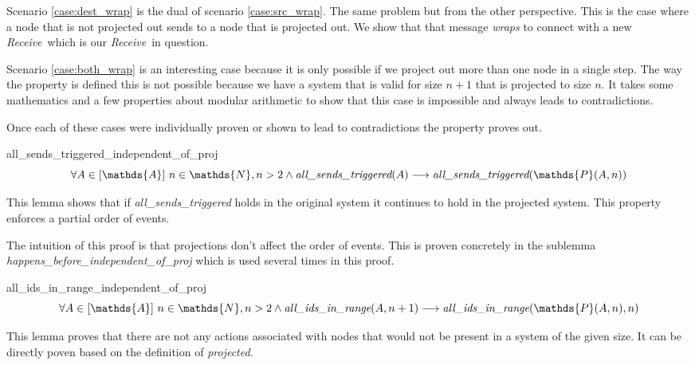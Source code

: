\documentclass[runningheads]{llncs}
\newcommand{\receive}{\emph{Receive}}
\newcommand{\action}{\mathds{A}}
\newcommand{\listaction}{[\action]}
\newcommand{\projectsize}[2]{\mathds{P}(#1, #2)}
\newcommand{\allst}[1]{\emph{all\_sends\_triggered}(#1)}
\newcommand{\allir}[2]{\emph{all\_ids\_in\_range}(#1, #2)}
\begin{document}
Scenario \ref{case:dest_wrap} is the dual of scenario \ref{case:src_wrap}. The same problem but from the other perspective. This is the case where a node that is not projected out sends to a node that is projected out. We show that that message \emph{wraps} to connect with a new \receive\ which is our \receive\ in question. 

Scenario \ref{case:both_wrap} is an interesting case because it is only possible if we project out more than one node in a single step. The way the property is defined this is not possible because we have a system that is valid for size $n+1$ that is projected to size $n$. It takes some mathematics and a few properties about modular arithmetic to show that this case is impossible and always leads to contradictions.


Once each of these cases were individually proven or shown to lead to contradictions the property proves out.

\begin{lemma}{all\_sends\_triggered\_independent\_of\_proj}
$$ \forall A \in \listaction\ n \in \mathds{N}, n > 2 \wedge \allst{A} \longrightarrow \allst{\projectsize{A}{n}} $$
\end{lemma}
This lemma shows that if \emph{all\_sends\_triggered} holds in the original system it continues to hold in the projected system. This property enforces a partial order of events.

The intuition of this proof is that projections don't affect the order of events. This is proven concretely in the sublemma \emph{happens\_before\_independent\_of\_proj} which is used several times in this proof. 

\begin{lemma}{all\_ids\_in\_range\_independent\_of\_proj}
$$ \forall A \in \listaction\ n \in \mathds{N}, n > 2 \wedge \allir{A}{n+1} \longrightarrow \allir{\projectsize{A}{n}}{n} $$
\end{lemma}
This lemma proves that there are not any actions associated with nodes that would not be present in a system of the given size. It can be directly poven based on the definition of \emph{projected}. 
\end{document}
